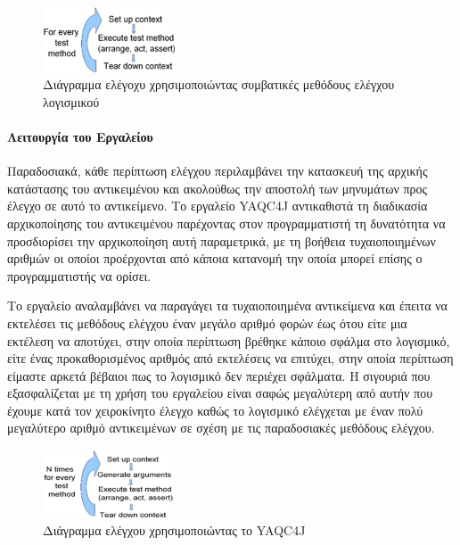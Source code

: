 \documentclass[12pt]{article}
\begin{document}
\begin{figure}
\centering
    \includegraphics[width=0.35\textwidth]{conventional_testing.png}
    \caption{Διάγραμμα ελέγοχυ χρησιμοποιώντας συμβατικές μεθόδους ελέγχου λογισμικού}
    \label{fig:conventional_testing}
\end{figure}

\paragraph{Λειτουργία του Εργαλείου}

Παραδοσιακά, κάθε περίπτωση ελέγχου περιλαμβάνει την κατασκευή της αρχικής κατάστασης του αντικειμένου και ακολούθως την αποστολή των μηνυμάτων προς έλεγχο σε αυτό το αντικείμενο. Το εργαλείο YAQC4J αντικαθιστά τη διαδικασία αρχικοποίησης του αντικειμένου παρέχοντας στον προγραμματιστή τη δυνατότητα να προσδιορίσει την αρχικοποίηση αυτή παραμετρικά, με τη βοήθεια τυχαιοποιημένων αριθμών οι οποίοι προέρχονται από κάποια κατανομή την οποία μπορεί επίσης ο προγραμματιστής να ορίσει.

\par Το εργαλείο αναλαμβάνει να παραγάγει τα τυχαιοποιημένα αντικείμενα και έπειτα να εκτελέσει τις μεθόδους ελέγχου έναν μεγάλο αριθμό φορών έως ότου είτε μια εκτέλεση να αποτύχει, στην οποία περίπτωση βρέθηκε κάποιο σφάλμα στο λογισμικό, είτε ένας προκαθορισμένος αριθμός από εκτελέσεις να επιτύχει,  στην οποία περίπτωση είμαστε αρκετά βέβαιοι πως το λογισμικό δεν περιέχει σφάλματα. Η σιγουριά που εξασφαλίζεται με τη χρήση του εργαλείου είναι σαφώς μεγαλύτερη από αυτήν που έχουμε κατά τον χειροκίνητο έλεγχο καθώς το λογισμικό ελέγχεται με έναν  πολύ μεγαλύτερο αριθμό αντικειμένων σε σχέση με τις παραδοσιακές μεθόδους ελέγχου.

\begin{figure}
\centering
    \includegraphics[width=0.35\textwidth]{testing_with_yaqc4j.png}
    \caption{Διάγραμμα ελέγχου χρησιμοποιώντας το YAQC4J}
    \label{fig:yaqc4j_testing}
\end{figure}
\end{document}
